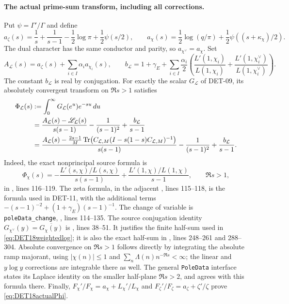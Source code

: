 \documentclass[11pt,a4paper]{article}
\newcommand{\Tr}{\operatorname{Tr}}
\newcommand{\fid}[1]{\textsf{#1}}
\begin{document}
\paragraph{The actual prime-sum transform, including all corrections.}
Put $\psi=\Gamma'/\Gamma$ and define
\[
 a_\zeta(s)=\frac1s+\frac1{s-1}
 -\frac12\log\pi+\frac12\psi(s/2),\qquad
 a_\chi(s)=\frac12\log(q/\pi)
 +\frac12\psi((s+\kappa_\chi)/2).
\]
The dual character has the same conductor and parity, so
$a_{\chi^\vee}=a_\chi$. Set
\[
 A_{\mathcal L}(s)=a_\zeta(s)+\sum_{i\in I}\alpha_i a_{\chi_i}(s),
 \qquad
 b_{\mathcal L}=1+\gamma_E+
 \sum_{i\in I}\frac{\alpha_i}{2}
 \left(\frac{L'(1,\chi_i)}{L(1,\chi_i)}
 +\frac{L'(1,\chi_i^\vee)}{L(1,\chi_i^\vee)}\right).
\]
The constant $b_{\mathcal L}$ is real by conjugation.
For exactly the scalar $G_{\mathcal L}$ of \fid{DET-09}, its
absolutely convergent transform on $\Re s>1$ satisfies
\begin{align}\label{eq:DET18actualPhi}
 \Phi_{\mathcal L}(s)
 &:=\int_0^\infty G_{\mathcal L}(e^u)e^{-su}\,du \notag\\
 &=\frac{A_{\mathcal L}(s)-\mathscr L_{\mathcal L}(s)}
 {s(s-1)}
 -\frac1{(s-1)^2}+\frac{b_{\mathcal L}}{s-1}\notag\\
 &=\frac{A_{\mathcal L}(s)-
 \frac{2s-1}{M}\Tr\!\left(C_{\mathcal L,M}
 (I-s(1-s)C_{\mathcal L,M})^{-1}\right)}
 {s(s-1)}
 -\frac1{(s-1)^2}+\frac{b_{\mathcal L}}{s-1}.
\end{align}
Indeed, the exact nonprincipal source formula is
\[
 \Phi_\chi(s)=
 -\frac{L'(s,\chi)/L(s,\chi)}{s(s-1)}
 +\frac{L'(1,\chi)/L(1,\chi)}{s-1},
 \qquad \Re s>1,
\]
in
,
lines 116--119. The zeta formula, in the adjacent
, lines 115--118, is the formula used in
\fid{DET-11}, with the additional terms
$-(s-1)^{-2}+(1+\gamma_E)(s-1)^{-1}$.
The change of variable is \texttt{poleData\_change},
, lines 114--135.
The source conjugation identity
$G_{\chi^\vee}(y)=\overline{G_\chi(y)}$ is
, lines 38--51. It justifies the finite
half-sum used in \eqref{eq:DET18weightedlog}; it is also the exact
half-sum in , lines 248--261 and 288--304.
Absolute convergence on $\Re s>1$ follows directly by integrating
the absolute ramp majorant, using $|\chi(n)|\le1$ and
$\sum_n\Lambda(n)n^{-\Re s}<\infty$; the linear and $y\log y$
corrections are integrable there as well. The general
\texttt{PoleData} interface states its Laplace identity on the
smaller half-plane $\Re s>2$, and agrees with this formula there.
Finally,
$F_\chi'/F_\chi=a_\chi+L_\chi'/L_\chi$ and
$F_\zeta'/F_\zeta=a_\zeta+\zeta'/\zeta$ prove
\eqref{eq:DET18actualPhi}.
\end{document}
